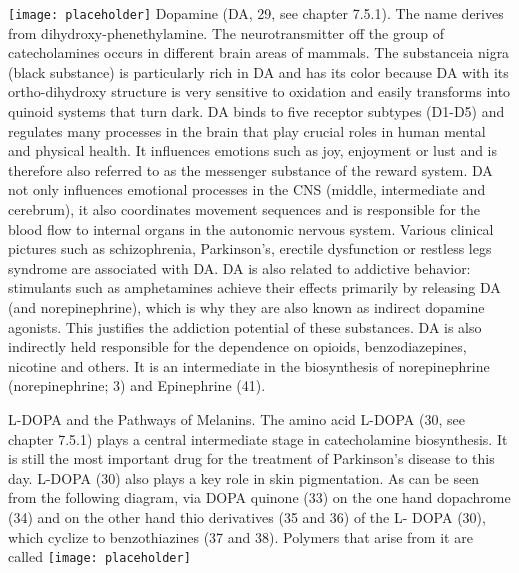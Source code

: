\texttt{[image: placeholder]}
Dopamine (DA, 29, see chapter 7.5.1). The name derives
from dihydroxy-phenethylamine. The neurotransmitter off
the group of catecholamines occurs in different brain areas of mammals. The substanceia nigra (black substance) is particularly rich in DA and has its color because DA with its ortho-dihydroxy structure is very sensitive to oxidation and easily transforms into quinoid systems that turn dark.
DA binds to five receptor subtypes (D1-D5) and regulates many processes in the brain that play crucial roles in human mental and physical health. It influences emotions such as joy, enjoyment or lust and is therefore also referred to as the messenger substance of the reward system. DA not only influences emotional processes in the CNS (middle, intermediate and cerebrum), it also coordinates movement sequences and is responsible for the blood flow to internal organs in the autonomic nervous system. Various clinical pictures such as schizophrenia, Parkinson's, erectile dysfunction or restless legs syndrome are associated with DA. DA is also related to addictive behavior: stimulants such as amphetamines achieve their effects primarily by releasing DA (and norepinephrine), which is why they are also known as indirect dopamine agonists.
This justifies the addiction potential of these substances. DA is also indirectly held responsible for the dependence on opioids, benzodiazepines, nicotine and others. It is an intermediate in the biosynthesis of norepinephrine (norepinephrine; 3) and Epinephrine (41).
\clearpage

L-DOPA and the Pathways of Melanins. The amino acid L-DOPA (30, see chapter 7.5.1) plays a central intermediate stage in catecholamine biosynthesis. It is still the most important drug for the treatment of Parkinson's disease to this day.
L-DOPA (30) also plays a key role in skin pigmentation. As can be seen from the following diagram, via DOPA quinone (33) on the one hand dopachrome (34) and on the other hand thio derivatives (35 and 36) of the L- DOPA (30), which cyclize to benzothiazines (37 and 38). Polymers that arise from it are called
\texttt{[image: placeholder]}
\clearpage

\clearpage

\clearpage

\clearpage

\clearpage

\clearpage

\clearpage

\clearpage

\clearpage

\clearpage

\clearpage

\clearpage

\clearpage

\clearpage

\clearpage

\clearpage

\clearpage

\clearpage



